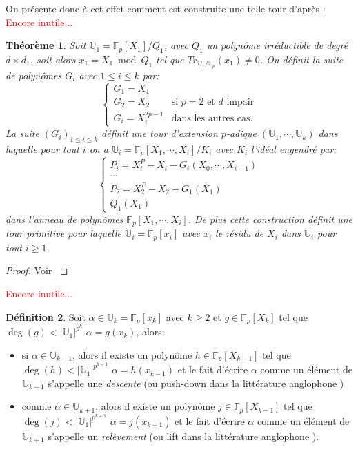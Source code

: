 \documentclass[10pt,a4paper]{book}
\theoremstyle{plain}
\newtheorem{thm}{Théorème}[chapter]
\theoremstyle{definition}
\theoremstyle{definition}
\theoremstyle{definition}
\theoremstyle{definition}
\newtheorem{defi}[thm]{Définition}
\theoremstyle{remark}
\theoremstyle{remark}
\theoremstyle{definition}
\begin{document}
On présente donc à cet effet comment est construite une telle tour d'après \cite{DeFeo-Shost'12}:
\textcolor{red}{Encore inutile...}
\begin{thm}
Soit $\mathbb{U}_1=\mathbb{F}_p[X_1]/Q_1$, avec $Q_1$ un polynôme irréductible de degré $d \times d_1$, soit alors $x_1=X_1 \bmod Q_1$ tel que $Tr_{\mathbb{U}_1/\mathbb{F}_p}(x_1)\neq 0$. On définit la suite de polynômes $G_i$ avec $ 1 \leqslant i \leqslant k$ par:
\begin{equation}
\begin{cases}
G_1=X_1 & \\
G_2=X_2 & \text{si } p=2 \text{ et } d \text{ impair} \\
G_i=X_i^{2p-1} & \text{dans les autres cas.} 
\end{cases}
\end{equation}
La suite $(G_i)_{1 \leqslant i \leqslant k }$ définit une \emph{tour d'extension $p$-adique} $(\mathbb{U}_1, \cdots, \mathbb{U}_k)$ dans laquelle pour tout $i$ on a $\mathbb{U}_i=\mathbb{F}_p[X_1, \cdots, X_i]/K_i$ avec $K_i$ l'idéal engendré par:
\begin{equation}
\begin{cases}
P_i=X_i^P-X_i-G_i(X_0, \cdots,X_{i-1}) \\
\cdots \\
P_2=X_2^P-X_2-G_1(X_1)\\
Q_1(X_1)
\end{cases}
\end{equation}
dans l'anneau de polynômes $\mathbb{F}_p[X_1, \cdots, X_i]$. De plus cette construction définit une tour primitive pour laquelle $\mathbb{U}_i=\mathbb{F}_p[x_i]$ avec $x_i$ le résidu de $X_i$ dans $\mathbb{U}_i$ pour tout $i \geqslant 1$.    
\end{thm} 

\begin{proof}
Voir  \cite[Théorème 2]{DeFeo-Shost'12} 
\end{proof}
\textcolor{red}{Encore inutile...}
\begin{defi}
Soit $\alpha \in \mathbb{U}_k=\mathbb{F}_p[x_k]$ avec $k \geqslant 2$ et $g \in \mathbb{F}_p[X_k]$ tel que $\deg(g)<|\mathbb{U}_1|^{p^k}$ $\alpha=g(x_k)$, alors:
\begin{itemize} 
\item si $\alpha \in \mathbb{U}_{k-1}$, alors il existe un polynôme $h \in \mathbb{F}_p[X_{k-1}]$ tel que $\deg(h)<|\mathbb{U}_1|^{p^{k-1}}$ $\alpha=h(x_{k-1})$ et le fait d'écrire $\alpha$ comme un élément de $\mathbb{U}_{k-1}$ s'appelle une \emph{descente} (ou push-down dans la littérature anglophone \cite{DeFeo-Shost'12})
\item comme $\alpha \in \mathbb{U}_{k+1}$, alors il existe un polynôme $j \in \mathbb{F}_p[X_{k-1}]$ tel que $\deg(j)<|\mathbb{U}_1|^{p^{k+1}}$ $\alpha=j(x_{k+1})$ et le fait d'écrire $\alpha$ comme un élément de $\mathbb{U}_{k+1}$ s'appelle un \emph{relèvement} (ou lift dans la littérature anglophone \cite{DeFeo-Shost'12}).
\end{itemize}
\end{defi}
\end{document}
